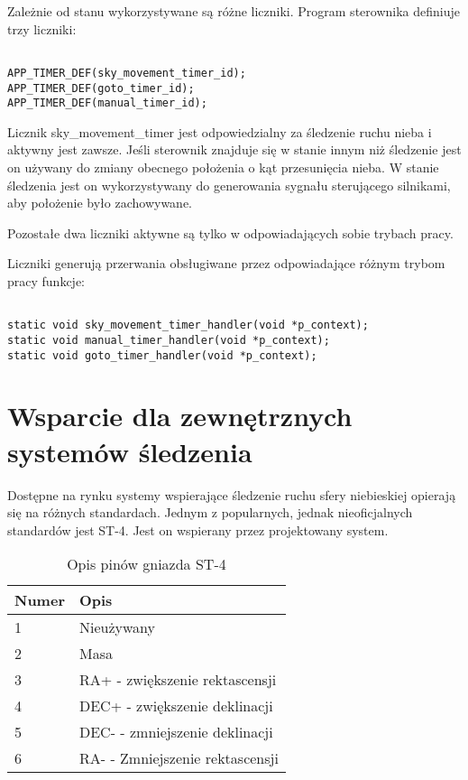 Zależnie od stanu wykorzystywane są różne liczniki. Program sterownika definiuje
trzy liczniki:

\begin{lstlisting}

APP_TIMER_DEF(sky_movement_timer_id);
APP_TIMER_DEF(goto_timer_id);
APP_TIMER_DEF(manual_timer_id);

\end{lstlisting}

Licznik sky\_movement\_timer jest odpowiedzialny za śledzenie ruchu nieba
i aktywny jest zawsze. Jeśli sterownik znajduje się w stanie innym niż śledzenie
jest on używany do zmiany obecnego położenia o kąt przesunięcia nieba. W stanie
śledzenia jest on wykorzystywany do generowania sygnału sterującego silnikami,
aby położenie było zachowywane.

Pozostałe dwa liczniki aktywne są tylko w odpowiadających sobie trybach pracy.

Liczniki generują przerwania obsługiwane przez odpowiadające różnym trybom pracy
funkcje:

\begin{lstlisting}

static void sky_movement_timer_handler(void *p_context);
static void manual_timer_handler(void *p_context);
static void goto_timer_handler(void *p_context);

\end{lstlisting}

\section{Wsparcie dla zewnętrznych systemów śledzenia}

Dostępne na rynku systemy wspierające śledzenie ruchu sfery niebieskiej opierają
się na różnych standardach. Jednym z popularnych, jednak nieoficjalnych
standardów jest ST-4. Jest on wspierany przez projektowany system.

\begin{table}[h]

\begin{tabularx}{\linewidth}{|l|X|}

\hline Numer & Opis \\
	
	\hline 1 & Nieużywany \\
	
	\hline 2 & Masa \\

	\hline 3 & RA+ - zwiększenie rektascensji \\

	\hline 4 & DEC+ - zwiększenie deklinacji \\

	\hline 5 & DEC- - zmniejszenie deklinacji \\

	\hline 6 & RA- - Zmniejszenie rektascensji \\

\hline \end{tabularx}

\caption{Opis pinów gniazda ST-4}

\label{tab:st4-pinout}

\end{table}

